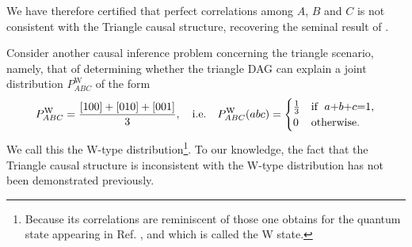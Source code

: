 We have therefore certified that perfect correlations among $A$, $B$ and $C$ is not consistent with the Triangle causal structure, recovering the seminal result of \citet{steudel2010ancestors}.




\par\smallskip\nobreak

Consider another causal inference problem concerning the triangle scenario, namely, that of determining whether the triangle DAG can explain a joint distribution $P^{\text{W}}_{A B C}$ of the form
\begin{align}\label{eq:wdistribution1}
P^{\text{W}}_{A B C}=\frac{[100]+[010]+[001]}{3},\quad\text{i.e.}\quad P^{\text{W}}_{A B C}(a b c)=\begin{cases}\tfrac{1}{3}&\text{if }\; a\mathord{+}b\mathord{+}c\mathord{=} 1, \\ 0&\text{otherwise}.\end{cases}
\end{align}
We call this the W-type distribution\footnote{Because its correlations are reminiscent of those one obtains for the quantum state appearing in Ref. \cite{3Qubits2Ways}, and which is called the W state.}. To our knowledge, the fact that the Triangle causal structure is inconsistent with the W-type distribution has not been demonstrated previously.

